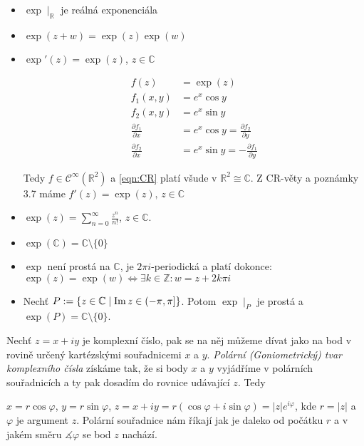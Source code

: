 \begin{properties}
\mbox{}
\vspace{-2em}
\begin{itemize}    
    \item $\exp \mid_\mathbb{R}$ je reálná exponenciála 
    \item $\exp(z+w)=\exp(z)\exp(w)$
    \item $\exp'(z)=\exp(z)$, $ z \in\mathbb{C}$
 
 \begin{equation}
 \begin{aligned}
    f(z)&=\exp(z)\\
    f_1(x,y)&=e^x \cos y\\
    f_2(x,y)&=e^x\sin y\\
    \frac{\partial f_1}{\partial x} &= e^x\cos y = \frac{\partial f_2}{\partial y}\\
     \frac{\partial f_2}{\partial x} &= e^x \sin y= - \frac{\partial f_1}{\partial y}
\end{aligned}
\end{equation}
   
     
     
     
    Tedy $f\in\mathcal{C}^{\infty}(\mathbb{R}^2)$ %
    a \cref{eqn:CR} platí všude v $\mathbb{R}^2\cong\mathbb{C}$. Z CR-věty a poznámky 3.7 máme $f'(z)=\exp(z)\text{, } z\in\mathbb{C}$
    \item $\exp(z)=\sum_{n=0}^{\infty}\frac{z^n}{n!}$, $z\in\mathbb{C}\text{.}$
    \item $\exp(\mathbb{C})=\mathbb{C}\setminus\{0\}$ 
    \item $\exp$ není prostá na $\mathbb{C}$, je $2\pi i$-periodická a platí dokonce:
    \newline
    $\exp(z) =\exp(w) \iff\exists k \in\mathbb{Z}\colon w=z+2k\pi i$
     \item Nechť $P:=\{z\in\mathbb{C}\mid \operatorname{Im} z \in \left (-\pi,\pi\right ]\}$.
     Potom $\exp\mid_P$ je prostá a $\exp(P)=\mathbb{C}\setminus\{0\}$.
    \newline
  \end{itemize}  
  \end{properties}
  \begin{definition}
    Nechť $z=x+iy$ je komplexní číslo, pak se na něj můžeme dívat jako na bod v rovině určený kartézskými souřadnicemi $x$ a $y$. \emph{Polární (Goniometrický) tvar komplexního čísla} získáme tak, že si body $x$ a $y$ vyjádříme v polárních souřadnicích a ty pak dosadím do rovnice udávající $z$. Tedy
    
    
       $x=r\cos \varphi$, 
       $y=r\sin \varphi$, 
       $z=x+iy=r(\cos \varphi + i \sin \varphi)=\lvert z \rvert e^{i\varphi} $, kde $r=\lvert z \rvert$ a $\varphi$ je argument $z$.
       Polární souřadnice nám říkají jak je daleko od počátku $r$ a v jakém směru  $\measuredangle \varphi$ se bod $z$ nachází.
 \end{definition}
     
